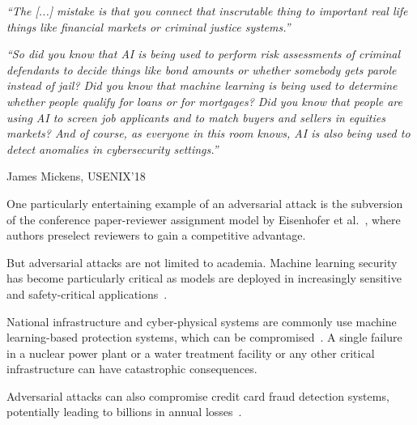 \documentclass[a4paper, oneside]{discothesis}
\begin{document}
\begin{quotebox}
	\begin{flushright}
		\textit{``The [...] mistake is that you connect that inscrutable thing to important real life things like financial markets or criminal justice systems.''}
		\vspace{1em}

		\textit{``So did you know that AI is being used to perform risk assessments of criminal defendants to decide things like bond amounts or whether somebody gets parole instead of jail? Did you know that machine learning is being used to determine whether people qualify for loans or for mortgages? Did you know that people are using AI to screen job applicants and to match buyers and sellers in equities markets? And of course, as everyone in this room knows, AI is also being used to detect anomalies in cybersecurity settings.''}
		\vspace{1em}

		\textemdash{} James Mickens, USENIX'18~\cite{218395}
	\end{flushright}
\end{quotebox}

One particularly entertaining example of an adversarial attack is the subversion of the conference paper-reviewer assignment model by Eisenhofer et al.~\cite{eisenhofer2023no}, where authors preselect reviewers to gain a competitive advantage.

But adversarial attacks are not limited to academia. Machine learning security has become particularly critical as models are deployed in increasingly sensitive and safety-critical applications~\cite{10585001, ifci2023AnalysisOT, 9099439, Khadka2022ResilientML, yilmaz2021privacy, apruzzese2023real, kumar2020legal, Cao2020HateGANAG, Nurseitov2022ApplicationOM, Zolotukhin2022AttacksAM, huggingface2024security}.

National infrastructure and cyber-physical systems are commonly use machine learning-based protection systems, which can be compromised~\cite{Moradpoor2023TheTO, Chevardin2023AnalysisOA, Ulybyshev2021TrustworthyDA, Halak2022TowardsAP, Rudolph2008DevelopingPS}. A single failure in a nuclear power plant or a water treatment facility or any other critical infrastructure can have catastrophic consequences.

Adversarial attacks can also compromise credit card fraud detection systems, potentially leading to billions in annual losses~\cite{Gu2022DeepLT, Agarwal2021BlackBoxAE, Tsai2024EffectiveAE}.
\end{document}
